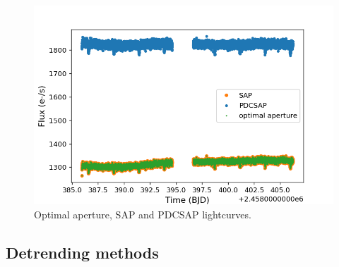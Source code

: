 \documentclass{aa}
\begin{document}
\begin{figure}[h]
    \centering
    \includegraphics[scale=0.3, angle=0]{pictures/lightcurve.png}
    \caption{Optimal aperture, SAP and PDCSAP lightcurves.}
    \label{fig:tess_lc}
\end{figure}


\subsection{Detrending methods}
\end{document}
